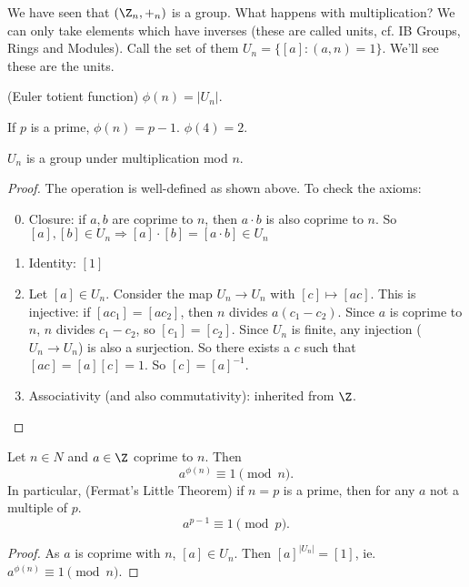\documentclass[a4paper]{article}
\begin{document}
We have seen that $(\Z_n, +_n)$ is a group. What happens with multiplication? We can only take elements which have inverses (these are called units, cf. IB Groups, Rings and Modules). Call the set of them $U_n = \{[a]: (a, n) = 1\}$. We'll see these are the units.
\begin{defi}
  (Euler totient function) $\phi (n) = |U_n|$.
\end{defi}

\begin{eg}
  If $p$ is a prime, $\phi(n) = p - 1$. $\phi(4) = 2$.
\end{eg}

\begin{prop}
  $U_n$ is a group under multiplication mod $n$.
\end{prop}

\begin{proof}
  The operation is well-defined as shown above. To check the axioms:
  \begin{enumerate}[label=\arabic{*}.]
      \setcounter{enumi}{-1}
    \item Closure: if $a, b$ are coprime to $n$, then $a\cdot b$ is also coprime to $n$. So $[a], [b]\in U_n \Rightarrow [a]\cdot [b] = [a\cdot b]\in U_n$
    \item Identity: $[1]$
    \item Let $[a]\in U_n$. Consider the map $U_n \to U_n$ with $[c]\mapsto [ac]$. This is injective: if $[ac_1] = [ac_2]$, then $n $ divides $a(c_1 - c_2)$. Since $a$ is coprime to $n$, $n$ divides $c_1 - c_2$, so $[c_1] = [c_2]$. Since $U_n$ is finite, any injection ($U_n \to U_n$) is also a surjection. So there exists a $c$ such that $[ac] = [a][c] = 1$. So $[c] = [a]^{-1}$.
    \item Associativity (and also commutativity): inherited from $\Z$.
  \end{enumerate}
\end{proof}
\begin{thm} Let $n\in N$ and $a\in \Z$ coprime to $n$. Then
  \[
    a^{\phi(n)} \equiv 1\pmod n.
  \]
  In particular, (Fermat's Little Theorem) if $n = p$ is a prime, then for any $a$ not a multiple of $p$.
  \[
    a^{p - 1}\equiv 1\pmod p.
  \]
\end{thm}

\begin{proof}
  As $a$ is coprime with $n$, $[a]\in U_n$. Then $[a]^{|U_n|} = [1]$, ie. $a^{\phi(n)} \equiv 1\pmod n$.
\end{proof}
\end{document}
